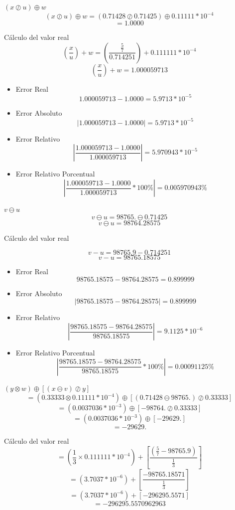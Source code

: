 \documentclass[12pt]{article}
\begin{document}
\large\textbf{$(x \oslash u)\oplus w$}
\normalsize\newline
$$(x \oslash u)\oplus w = (0.71428 \oslash 0.71425)\oplus 0.11111*10^{-4} $$
$$ = 1.0000$$

Cálculo del valor real
$$(\frac{x}{u}) + w = (\frac{\frac{5}{7}}{0.714251}) + 0.111111*10^{-4}$$
$$(\frac{x}{u}) + w = 1.000059713$$

\begin{itemize}
\item Error Real
$$1.000059713 - 1.0000 = 5.9713*10^{-5}$$
\item Error Absoluto
$$
\left| 1.000059713 - 1.0000 \right| = 5.9713*10^{-5}
$$
\item Error Relativo
$$
\left| \frac{1.000059713 - 1.0000}{1.000059713} \right| = 5.970943*10^{-5}
$$
\item Error Relativo Porcentual
$$
\left| \frac{1.000059713 - 1.0000}{1.000059713} *100\% \right| = 0.005970943\%
$$ 
\end{itemize}


\large\textbf{$v \ominus  u$}
\normalsize\newline
$$v \ominus  u = 98765. \ominus 0.71425$$
$$v \ominus  u = 98764.28575$$

Cálculo del valor real

$$v - u = 98765.9 - 0.714251$$
$$v - u = 98765.18575 $$

\begin{itemize}
\item Error Real
$$98765.18575 - 98764.28575 = 0.899999$$
\item Error Absoluto
$$
\left| 98765.18575 - 98764.28575 \right| = 0.899999
$$
\item Error Relativo
$$
\left| \frac{98765.18575 - 98764.28575}{98765.18575} \right| = 9.1125*10^{-6}
$$
\item Error Relativo Porcentual
$$
\left| \frac{98765.18575 - 98764.28575}{98765.18575} *100\% \right| = 0.00091125\%
$$ 
\end{itemize}


\large\textbf{$(y \otimes  w) \oplus [(x \ominus v) \oslash y]$}
\normalsize\newline 
$$ = (0.33333 \otimes  0.11111*10^{-4}) \oplus [(0.71428 \ominus 98765.) \oslash 0.33333]$$
$$ = (0.0037036*10^{-3}) \oplus [-98764. \oslash 0.33333]$$
$$ = (0.0037036*10^{-3}) \oplus [-29629.]$$
$$ = -29629.$$

Cálculo del valor real
$$ = (\frac{1}{3} \times 0.111111*10^{-4}) + [\frac{(\frac{5}{7} - 98765.9)}{\frac{1}{3}}]$$
$$ = (3.7037*10^{-6}) + [\frac{-98765.18571}{\frac{1}{3}}]$$
$$ = (3.7037*10^{-6}) + [-296295.5571]$$
$$ = -296295.5570962963$$
\end{document}
